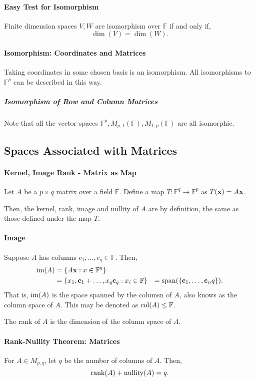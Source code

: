 \paragraph{Easy Test for Isomorphism}
Finite dimension spaces \(V, W\) are isomorphism over 
\(\mathbb{F}\) if and only if,
\[ \dim(V) = \dim(W).\]

\paragraph{Isomorphism: Coordinates and Matrices}
Taking coordinates in some chosen basis is an isomorphism.
All isomorphisms to \(\mathbb{F}^p\) can be described in this way.

\subparagraph{Isomorphism of Row and Column Matrices}
Note that all the vector spaces
\(\mathbb{F}^p, M_{p, 1}(\mathbb{F}), M_{1, p}(\mathbb{F})\)
are all isomorphic.

\subsection{Spaces Associated with Matrices}

\paragraph{Kernel, Image Rank - Matrix as Map}
Let \(A\) be a \(p\times q\) matrix over a field \(\mathbb{F}\).
Define a map \(T: \mathbb{F}^q \to \mathbb{F}^p\)
as \(T(\mathbf{x}) = A\mathbf{x}\).

Then, the kernel, rank, image and nullity of \(A\) are by definition, the same
as those defined under the map \(T\).

\paragraph{Image}
Suppose \(A\) has columns \(c_1, \dots, c_q \in \mathbb{F}\).
Then,
\begin{align*}
    \mathrm{im}(A) &= \{A \mathbf{x} : x \in \mathbb{F}^q\} \\
            &= \{x_1, \mathbf{c}_1 + \dots, x_q \mathbf{c}_q : x_i \in \mathbb{F}\}
            &= \mathrm{span}(\{\mathbf{c}_1, \dots, \mathbf{c}_nq\}).
\end{align*}
That is, \(\mathrm{im}(A)\) is the space spanned by the columsn of \(A\), also
knows as the column space of \(A\).
This may be denoted as \(\mathrm{col}(A) \leq \mathbb{F}\).

The rank of \(A\) is the dimension of the column space of \(A\).

\paragraph{Rank-Nullity Theorem: Matrices}
For \(A\in M_{p, q} \), let \(q\) be the number of columns of \(A\).
Then, \[
    \rank(A) + \mathrm{nullity}(A) = q
.\]

